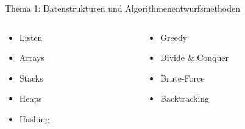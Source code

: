 \documentclass[aspectratio=169,xcolor=dvipsnames, t]{beamer}
\begin{document}
\begin{frame}{Thema 1: Datenstrukturen und Algorithmenentwurfsmethoden}
	\begin{columns}
		\begin{column}{0.5\textwidth}
			\begin{itemize}
				\item Listen
				\item Arrays
				\item Stacks
				\item Heaps
				\item Hashing
			\end{itemize}
		\end{column}
		\begin{column}{0.5\textwidth}
			\begin{itemize}
				\item Greedy
				\item Divide \& Conquer
				\item Brute-Force
				\item Backtracking
			\end{itemize}
		\end{column}
	\end{columns}
\end{frame}


\end{document}
